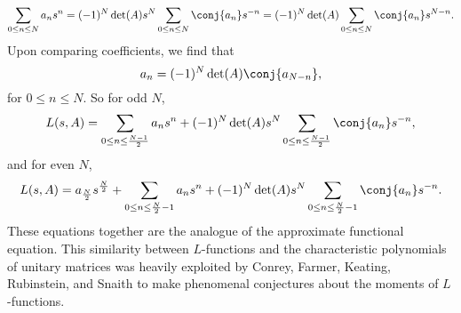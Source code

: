       \[
        \sum_{0 \le n \le N}a_{n}s^{n} = (-1)^{N}\det(A)s^{N}\sum_{0 \le n \le N}\conj{a_{n}}s^{-n} = (-1)^{N}\det(A)\sum_{0 \le n \le N}\conj{a_{n}}s^{N-n}.
      \]
      Upon comparing coefficients, we find that
      \[
        a_{n} = (-1)^{N}\det(A)\conj{a_{N-n}},
      \]
      for $0 \le n \le N$. So for odd $N$,
      \[
        L(s,A) = \sum_{0 \le n \le \frac{N-1}{2}}a_{n}s^{n}+(-1)^{N}\det(A)s^{N}\sum_{0 \le n \le \frac{N-1}{2}}\conj{a_{n}}s^{-n},
      \]
      and for even $N$,
      \[
        L(s,A) = a_{\frac{N}{2}}s^{\frac{N}{2}}+\sum_{0 \le n \le \frac{N}{2}-1}a_{n}s^{n}+(-1)^{N}\det(A)s^{N}\sum_{0 \le n \le \frac{N}{2}-1}\conj{a_{n}}s^{-n}.
      \]
      These equations together are the analogue of the approximate functional equation. This similarity between $L$-functions and the characteristic polynomials of unitary matrices was heavily exploited by Conrey, Farmer, Keating, Rubinstein, and Snaith to make phenomenal conjectures about the moments of $L$-functions.
  \section{}
  \section{}